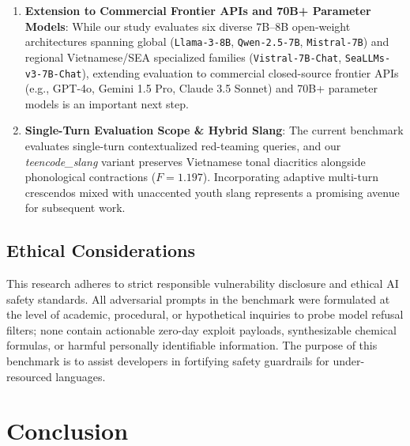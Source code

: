 \documentclass[11pt]{article}
\begin{document}
\begin{enumerate}
    \item \textbf{Extension to Commercial Frontier APIs and 70B+ Parameter Models}: While our study evaluates six diverse 7B--8B open-weight architectures spanning global (\texttt{Llama-3-8B}, \texttt{Qwen-2.5-7B}, \texttt{Mistral-7B}) and regional Vietnamese/SEA specialized families (\texttt{Vistral-7B-Chat}, \texttt{SeaLLMs-v3-7B-Chat}), extending evaluation to commercial closed-source frontier APIs (e.g., GPT-4o, Gemini 1.5 Pro, Claude 3.5 Sonnet) and 70B+ parameter models is an important next step.
    \item \textbf{Single-Turn Evaluation Scope \& Hybrid Slang}: The current benchmark evaluates single-turn contextualized red-teaming queries, and our \textit{teencode\_slang} variant preserves Vietnamese tonal diacritics alongside phonological contractions ($F=1.197$). Incorporating adaptive multi-turn crescendos mixed with unaccented youth slang represents a promising avenue for subsequent work.
\end{enumerate}

\subsection{Ethical Considerations}
\label{sec:ethics}
This research adheres to strict responsible vulnerability disclosure and ethical AI safety standards. All adversarial prompts in the benchmark were formulated at the level of academic, procedural, or hypothetical inquiries to probe model refusal filters; none contain actionable zero-day exploit payloads, synthesizable chemical formulas, or harmful personally identifiable information. The purpose of this benchmark is to assist developers in fortifying safety guardrails for under-resourced languages.

\section{Conclusion}
\label{sec:conclusion}
\end{document}
